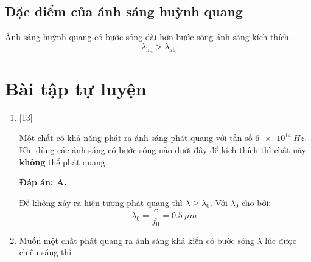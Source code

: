 \subsection{Đặc điểm của ánh sáng huỳnh quang}
Ánh sáng huỳnh quang có bước sóng dài hơn bước sóng ánh sáng kích thích.
\begin{equation}
	\lambda_\text{hq} > \lambda_\text{kt}
\end{equation}
\section{Bài tập tự luyện}
\begin{enumerate}[label=\bfseries Câu \arabic*:]
	
	\item {} [13] 
	\cauhoi
	{Một chất có khả năng phát ra ánh sáng phát quang với tần số $ \SI{6e14}{Hz} $. Khi dùng các ánh sáng có bước sóng nào dưới đây để kích thích thì chất này \textbf{không} thể phát quang
	}
	
	\loigiai
	{		\textbf{Đáp án: A.}
		
		Để không xảy ra hiện tượng phát quang thì $ \lambda \geq \lambda_{0} $. Với $ \lambda_{0} $ cho bởi:
		$$
		\lambda_{0} = \dfrac{c}{f_{0}} = \SI{0,5}{\mu m}.
		$$	
	}
	\item {}
	\cauhoi
	{Muốn một chất phát quang ra ánh sáng khả kiến có bước sóng $\lambda$ lúc được chiếu sáng thì
	}
	

\end{enumerate}
